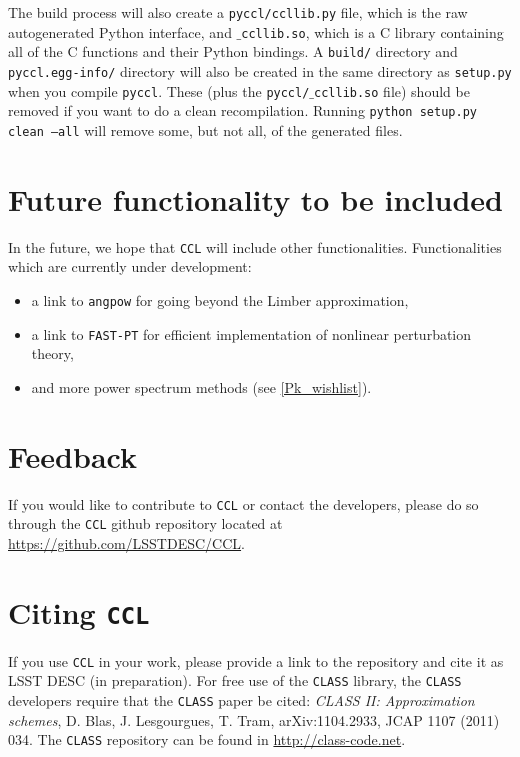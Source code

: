 \documentclass[\docopts]{\docclass}
\newcommand{\ccl}{{\tt CCL}\xspace}
\begin{document}
The build process will also create a {\tt pyccl/ccllib.py} file, which is the raw autogenerated Python interface, and {\tt $\_$ccllib.so}, which is a C library containing all of the C functions and their Python bindings. A {\tt build/} directory and {\tt pyccl.egg-info/} directory will also be created in the same directory as {\tt setup.py} when you compile {\tt pyccl}. These (plus the {\tt pyccl/$\_$ccllib.so} file) should be removed if you want to do a clean recompilation. Running {\tt python setup.py clean --all} will remove some, but not all, of the generated files.


\section{Future functionality to be included}
\label{sec:future}

In the future, we hope that \ccl will include other functionalities. Functionalities which are currently under development:
\begin{itemize}
        \item a link to {\tt angpow} \citep{2017arXiv170103592C} for going beyond the Limber approximation,
	\item a link to {\tt FAST-PT} \citep{FASTPT} for efficient implementation of nonlinear perturbation theory,
	\item and more power spectrum methods (see \ref{Pk_wishlist}).
\end{itemize}

\section{Feedback}
\label{sec:feedback}

If you would like to contribute to \ccl or contact the developers, please do so through the \ccl github repository located at \url{https://github.com/LSSTDESC/CCL}.

\section{Citing \ccl}
\label{sec:cite}

If you use \ccl in your work, please provide a link to the repository and cite it as LSST DESC (in preparation). For free use of the {\tt CLASS} library, the {\tt CLASS} developers require that the {\tt CLASS} paper be cited: {\it  CLASS II: Approximation schemes}, D. Blas, J. Lesgourgues, T. Tram, arXiv:1104.2933, JCAP 1107 (2011) 034. The {\tt CLASS} repository can be found in \url{http://class-code.net}.
\end{document}
